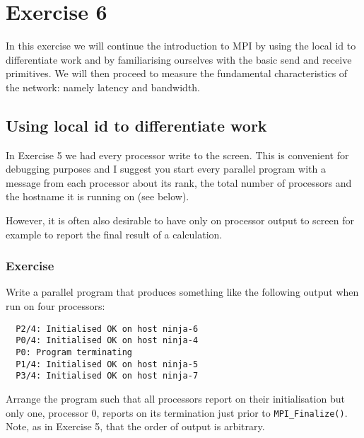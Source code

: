 \documentclass[12pt]{article}
\begin{document}
\section*{Exercise 6}

In this exercise we will continue the introduction to MPI
by using the local id to differentiate work and 
by familiarising ourselves with the basic send and receive 
primitives.
We will then proceed to measure the fundamental characteristics of 
the network: namely latency and bandwidth. 



\subsection*{Using local id to differentiate work}        
In Exercise 5 we had every processor write to the screen. This 
is convenient for debugging purposes 
and I suggest you start every parallel program 
with a message from each processor about its rank, the total number 
of processors and the hostname it is running on (see below).

However, it is often also desirable to have only on 
processor output to screen
for example to report the final result of a calculation.

\subsubsection*{Exercise}  
Write a parallel program that 
produces something like the following output when run on four processors:
\begin{verbatim}
  P2/4: Initialised OK on host ninja-6
  P0/4: Initialised OK on host ninja-4
  P0: Program terminating  
  P1/4: Initialised OK on host ninja-5
  P3/4: Initialised OK on host ninja-7      
\end{verbatim}
Arrange the program such that 
all processors report on their initialisation but 
only one, processor 0, reports on its termination just prior 
to \texttt{MPI\_Finalize()}. 
Note, as in Exercise 5, that the order of output is 
arbitrary.
\end{document}

